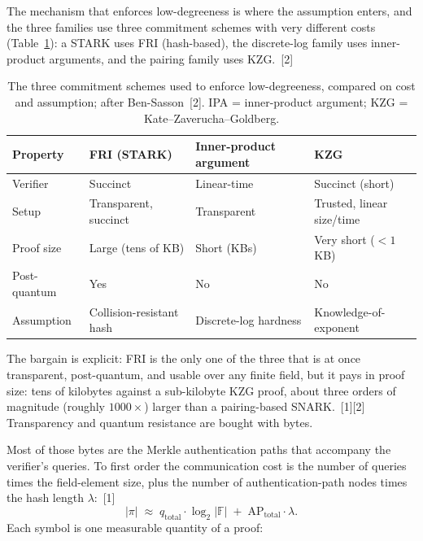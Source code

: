 \documentclass[11pt]{article}
\begin{document}
The mechanism that enforces low-degreeness is where the assumption enters, and the three families use
three commitment schemes with very different costs (Table~\ref{tab:t2}): a STARK uses FRI (hash-based),
the discrete-log family uses inner-product arguments, and the pairing family uses KZG.~[2]

\begin{table}[htbp]\centering\footnotesize
\caption{The three commitment schemes used to enforce low-degreeness, compared on cost and assumption;
after Ben-Sasson~[2]. IPA = inner-product argument; KZG = Kate--Zaverucha--Goldberg.}
\label{tab:t2}
\begin{tabular}{l l l l}
\toprule
Property & FRI (STARK) & Inner-product argument & KZG \\
\midrule
Verifier     & Succinct                & Linear-time           & Succinct (short) \\
Setup        & Transparent, succinct   & Transparent           & Trusted, linear size/time \\
Proof size   & Large (tens of KB)      & Short (KBs)           & Very short ($<1$ KB) \\
Post-quantum & Yes                     & No                    & No \\
Assumption   & Collision-resistant hash& Discrete-log hardness & Knowledge-of-exponent \\
\bottomrule
\end{tabular}
\end{table}

The bargain is explicit: FRI is the only one of the three that is at once transparent, post-quantum, and
usable over any finite field, but it pays in proof size: tens of kilobytes against a sub-kilobyte KZG
proof, about three orders of magnitude (roughly $1000\times$) larger than a pairing-based SNARK.~[1][2]
Transparency and quantum resistance are bought with bytes.

Most of those bytes are the Merkle authentication paths that accompany the verifier's queries. To first
order the communication cost is the number of queries times the field-element size, plus the number of
authentication-path nodes times the hash length $\lambda$:~[1]
\begin{equation}
  |\pi| \;\approx\; q_{\mathrm{total}}\cdot \log_2|\mathbb{F}| \;+\; \mathrm{AP}_{\mathrm{total}}\cdot \lambda .
  \label{eq:commcost}
\end{equation}
Each symbol is one measurable quantity of a proof:
\end{document}
